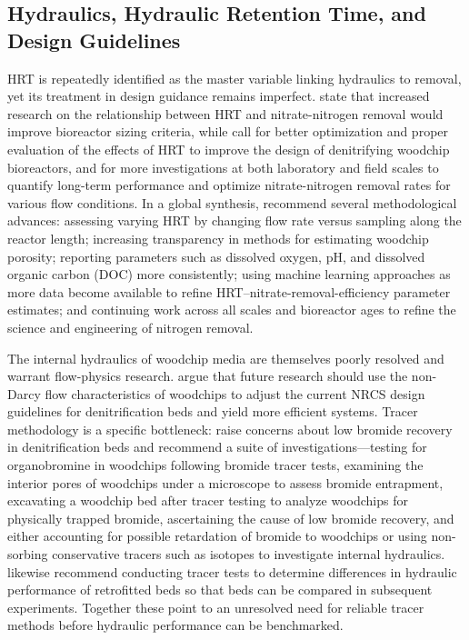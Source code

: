 \documentclass[11pt]{article}
\begin{document}
\subsection{Hydraulics, Hydraulic Retention Time, and Design Guidelines}
HRT is repeatedly identified as the master variable linking hydraulics to removal, yet its treatment in design guidance remains imperfect. \textcite{Moorman2015} state that increased research on the relationship between HRT and nitrate-nitrogen removal would improve bioreactor sizing criteria, while \textcite{Povilaitis2018} call for better optimization and proper evaluation of the effects of HRT to improve the design of denitrifying woodchip bioreactors, and for more investigations at both laboratory and field scales to quantify long-term performance and optimize nitrate-nitrogen removal rates for various flow conditions. In a global synthesis, \textcite{Christianson2025c} recommend several methodological advances: assessing varying HRT by changing flow rate versus sampling along the reactor length; increasing transparency in methods for estimating woodchip porosity; reporting parameters such as dissolved oxygen, pH, and dissolved organic carbon (DOC) more consistently; using machine learning approaches as more data become available to refine HRT--nitrate-removal-efficiency parameter estimates; and continuing work across all scales and bioreactor ages to refine the science and engineering of nitrogen removal.

The internal hydraulics of woodchip media are themselves poorly resolved and warrant flow-physics research. \textcite{Ghane2016} argue that future research should use the non-Darcy flow characteristics of woodchips to adjust the current NRCS design guidelines for denitrification beds and yield more efficient systems. Tracer methodology is a specific bottleneck: \textcite{Ghane2019b} raise concerns about low bromide recovery in denitrification beds and recommend a suite of investigations---testing for organobromine in woodchips following bromide tracer tests, examining the interior pores of woodchips under a microscope to assess bromide entrapment, excavating a woodchip bed after tracer testing to analyze woodchips for physically trapped bromide, ascertaining the cause of low bromide recovery, and either accounting for possible retardation of bromide to woodchips or using non-sorbing conservative tracers such as isotopes to investigate internal hydraulics. \textcite{Ghane2018} likewise recommend conducting tracer tests to determine differences in hydraulic performance of retrofitted beds so that beds can be compared in subsequent experiments. Together these point to an unresolved need for reliable tracer methods before hydraulic performance can be benchmarked.
\end{document}
